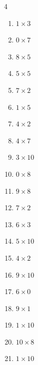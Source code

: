 \begin{multicols}{4}
\begin{enumerate}
  \item $1\times 3$
        \phantom{$=3$}

  \item $0\times 7$
        \phantom{$=0$}

  \item $8\times 5$
        \phantom{$=40$}

  \item $5\times 5$
        \phantom{$=25$}

  \item $7\times 2$
        \phantom{$=14$}

  \item $1\times 5$
        \phantom{$=5$}

  \item $4\times 2$
        \phantom{$=8$}

  \item $4\times 7$
        \phantom{$=28$}

  \item $3\times 10$
        \phantom{$=30$}

  \item $0\times 8$
        \phantom{$=0$}

  \item $9\times 8$
        \phantom{$=72$}

  \item $7\times 2$
        \phantom{$=14$}

  \item $6\times 3$
        \phantom{$=18$}

  \item $5\times 10$
        \phantom{$=50$}

  \item $4\times 2$
        \phantom{$=8$}

  \item $9\times 10$
        \phantom{$=90$}

  \item $6\times 0$
        \phantom{$=0$}

  \item $9\times 1$
        \phantom{$=9$}

  \item $1\times 10$
        \phantom{$=10$}

  \item $10\times 8$
        \phantom{$=80$}

  \item $1\times 10$
        \phantom{$=10$}


\end{enumerate}
\end{multicols}
